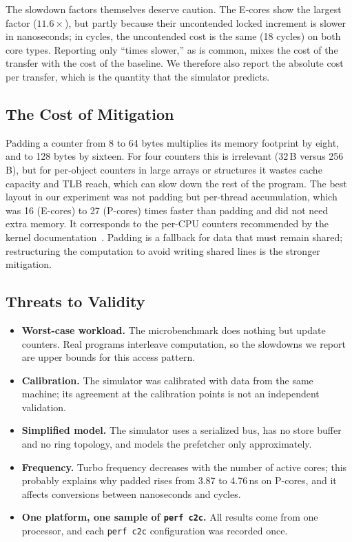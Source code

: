 \documentclass[journal]{IEEEtran}
\begin{document}
The slowdown factors themselves deserve caution. The E-cores show the largest
factor ($11.6\times$), but partly because their uncontended locked increment is
slower in nanoseconds; in cycles, the uncontended cost is the same (18 cycles)
on both core types. Reporting only ``times slower,'' as is common, mixes the
cost of the transfer with the cost of the baseline. We therefore also report
the absolute cost per transfer, which is the quantity that the simulator
predicts.

\subsection{The Cost of Mitigation}
Padding a counter from 8 to 64 bytes multiplies its memory footprint by eight,
and to 128 bytes by sixteen. For four counters this is irrelevant (32\,B versus
256\,B), but for per-object counters in large arrays or structures it wastes
cache capacity and TLB reach, which can slow down the rest of the program. The
best layout in our experiment was not padding but per-thread accumulation,
which was 16 (E-cores) to 27 (P-cores) times faster than padding and did not need extra memory. It
corresponds to the per-CPU counters recommended by the kernel
documentation~\cite{tang2023kernel}. Padding is a fallback for data that must
remain shared; restructuring the computation to avoid writing shared lines is
the stronger mitigation.

\subsection{Threats to Validity}
\begin{itemize}
  \item \textbf{Worst-case workload.} The microbenchmark does nothing but update
        counters. Real programs interleave computation, so the slowdowns we
        report are upper bounds for this access pattern.
  \item \textbf{Calibration.} The simulator was calibrated with data from the
        same machine; its agreement at the calibration points is not an
        independent validation.
  \item \textbf{Simplified model.} The simulator uses a serialized bus, has no
        store buffer and no ring topology, and models the prefetcher only
        approximately.
  \item \textbf{Frequency.} Turbo frequency decreases with the number of active
        cores; this probably explains why padded rises from 3.87 to 4.76\,ns on
        P-cores, and it affects conversions between nanoseconds and cycles.
  \item \textbf{One platform, one sample of \texttt{perf c2c}.} All results
        come from one processor, and each \texttt{perf c2c} configuration was
        recorded once.
\end{itemize}
\end{document}

